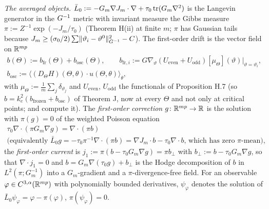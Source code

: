 \smallskip
\noindent\emph{The averaged objects.} $\bar L_0 := -G_m\nabla J_m\cdot\nabla + \tau_0\operatorname{tr}(G_m\nabla^2)$ is the
Langevin generator in the $G^{-1}$ metric with invariant measure the Gibbs measure $\pi := Z^{-1}\exp(-J_m/\tau_0)$
(Theorem H(ii) at finite $m$; $\pi$ has Gaussian tails because
$J_m\ge(\sigma_0/2)\sum\lVert \vartheta_i - \vartheta^0\rVert^2_{G^{-1}} - C$). The first-order drift is the vector field
on $\mathbb{R}^{mp}$
\begin{gather*}
  b(\Theta) := b_{\mathrm{fr}}(\Theta) + b_{\mathrm{osc}}(\Theta),\qquad
  b_{\mathrm{fr},i} := G\nabla_\vartheta(U_{\mathrm{even}} + U_{\mathrm{odd}})[\mu_\Theta](\vartheta)\big|_{\vartheta=\vartheta_i},\\
  b_{\mathrm{osc}} := \bigl\langle(D_\Theta H)(\Theta,\theta)\cdot u(\Theta,\theta)\bigr\rangle_\theta,
\end{gather*}
with $\mu_\Theta := \frac1m\sum_j\delta_{\vartheta_j}$ and $U_{\mathrm{even}}$, $U_{\mathrm{odd}}$ the functionals of
Proposition H.7 (so $b = k_e^2(b_{\mathrm{frozen}} + b_{\mathrm{osc}})$ of Theorem J, now at every $\Theta$ and not
only at critical points;  and  compute
it). The \emph{first-order correction} $g\colon\mathbb{R}^{mp}\to\mathbb{R}$ is the solution with $\pi(g) = 0$ of the weighted
Poisson equation
\begin{gather*}
  \tau_0\nabla\cdot(\pi G_m\nabla g) = \nabla\cdot(\pi b)\\
  \text{(equivalently $\bar L_0g = -\tau_0\pi^{-1}\nabla\cdot(\pi b) = \nabla J_m\cdot b - \tau_0\nabla\cdot b$, which has zero $\pi$-mean),}
\end{gather*}
the \emph{first-order current} is $j_1 := \pi(b - \tau_0G_m\nabla g) = \pi b_\perp$ with
$b_\perp := b - \tau_0G_m\nabla g$, so that $\nabla\cdot j_1 = 0$ and $b = G_m\nabla(\tau_0g) + b_\perp$ is the Hodge
decomposition of $b$ in $L^2(\pi;G_m^{-1})$ into a $G_m$-gradient and a $\pi$-divergence-free field. For an
observable $\varphi\in C^{3,\alpha}(\mathbb{R}^{mp})$ with polynomially bounded derivatives, $\psi_\varphi$ denotes the
solution of $\bar L_0\psi_\varphi = \varphi - \pi(\varphi)$, $\pi(\psi_\varphi) = 0$.

